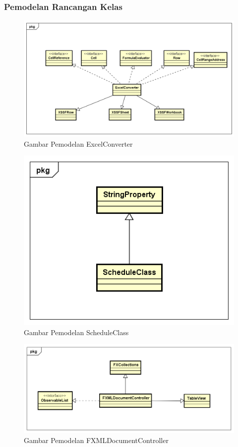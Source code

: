 \subsubsection{Pemodelan Rancangan Kelas}
\begin{figure}[H]
	\centering
	\includegraphics[scale=0.5]{Gambar/pemodelanExcelConverter}
	\caption{Gambar Pemodelan ExcelConverter}
	\label{fig:pemodelanExcelConverter}
\end{figure}

\begin{figure}[H]
	\centering
	\includegraphics[scale=0.6]{Gambar/pemodelanScheduleClass}
	\caption{Gambar Pemodelan ScheduleClass}
	\label{fig:pemodelanExcelConverter}
\end{figure}
\begin{figure}[H]
	\centering
	\includegraphics[scale=0.5]{Gambar/pemodelanFXMLDocumentController}
	\caption{Gambar Pemodelan FXMLDocumentController}
	\label{fig:pemodelanFXMLDocumentController}
\end{figure}


